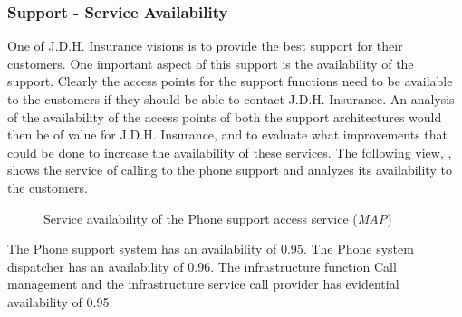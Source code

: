 \subsubsection{Support - Service Availability}
\label{sec:support_analysis}
One of J.D.H. Insurance visions is to provide the best support for their customers. One important aspect of this support is the availability of the support. Clearly the access points for the support functions need to be available to the customers if they should be able to contact J.D.H. Insurance. An analysis of the availability of the access points of both the support architectures would then be of value for J.D.H. Insurance, and to evaluate what improvements that could be done to increase the availability of these services. The following view, , shows the service of calling to the phone support and analyzes its availability to the customers.
\begin{center}
	\begin{figure}[H]
		\centering
		\setlength\fboxsep{7pt}
		\setlength\fboxrule{0.5pt}
		\caption{Service availability of the Phone support access service (\emph{MAP})}
		\label{fig:map_support_phone_availability}
	\end{figure}
\end{center}
The Phone support system has an availability of 0.95. The Phone system dispatcher has an availability of 0.96. The infrastructure function Call management and the infrastructure service call provider has evidential availability of 0.95.\\\\
